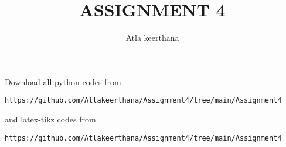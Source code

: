 \documentclass[journal,12pt,twocolumn]{IEEEtran}
\begin{document}
%


\newtheorem{theorem}{Theorem}[section]
\newtheorem{problem}{Problem}
\newtheorem{proposition}{Proposition}[section]
\newtheorem{lemma}{Lemma}[section]
\newtheorem{corollary}[theorem]{Corollary}
\newtheorem{example}{Example}[section]
\newtheorem{definition}[problem]{Definition}
\newcommand{\BEQA}{\begin{eqnarray}}
\newcommand{\EEQA}{\end{eqnarray}}
\newcommand{\define}{\stackrel{\triangle}{=}}

\providecommand{\mbf}{\mathbf}
\providecommand{\pr}[1]{\ensuremath{\Pr\left(#1\right)}}
\providecommand{\qfunc}[1]{\ensuremath{Q\left(#1\right)}}
\providecommand{\sbrak}[1]{\ensuremath{{}\left[#1\right]}}
\providecommand{\lsbrak}[1]{\ensuremath{{}\left[#1\right.}}
\providecommand{\rsbrak}[1]{\ensuremath{{}\left.#1\right]}}
\providecommand{\brak}[1]{\ensuremath{\left(#1\right)}}
\providecommand{\lbrak}[1]{\ensuremath{\left(#1\right.}}
\providecommand{\rbrak}[1]{\ensuremath{\left.#1\right)}}
\providecommand{\cbrak}[1]{\ensuremath{\left\{#1\right\}}}
\providecommand{\lcbrak}[1]{\ensuremath{\left\{#1\right.}}
\providecommand{\rcbrak}[1]{\ensuremath{\left.#1\right\}}}
\theoremstyle{remark}
\newtheorem{rem}{Remark}
\newcommand{\sgn}{\mathop{\mathrm{sgn}}}
\providecommand{\abs}[1]{\left\vert#1\right\vert}
\providecommand{\res}[1]{\Res\displaylimits_{#1}} 
\providecommand{\norm}[1]{\left\lVert#1\right\rVert}
\providecommand{\mtx}[1]{\mathbf{#1}}
\providecommand{\mean}[1]{E\left[ #1 \right]}
\providecommand{\fourier}{\overset{\mathcal{F}}{ \rightleftharpoons}}
\providecommand{\system}{\overset{\mathcal{H}}{ \longleftrightarrow}}
\newcommand{\myvec}[1]{\ensuremath{\begin{pmatrix}#1\end{pmatrix}}}
\newcommand{\cmyvec}[1]{\ensuremath{\begin{pmatrix*}[c]#1\end{pmatrix*}}}
\newcommand{\mydet}[1]{\ensuremath{\begin{vmatrix}#1\end{vmatrix}}}
\newcommand{\proj}[2]{\textbf{proj}_{\vec{#1}}\vec{#2}}
\let\StandardTheFigure\thefigure
\let\vec\mathbf
\title{
ASSIGNMENT 4
}
\author{Atla keerthana}
	
\maketitle
\renewcommand{\thefigure}{\theenumi}
\renewcommand{\thetable}{\theenumi}
  Download all python codes from 
\begin{lstlisting}
https://github.com/Atlakeerthana/Assignment4/tree/main/Assignment4
\end{lstlisting}
%
and latex-tikz codes from 
%
\begin{lstlisting}
https://github.com/Atlakeerthana/Assignment4/tree/main/Assignment4
\end{lstlisting}
%
\end{document}
